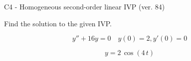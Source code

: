\begin{exercise}
  \begin{exerciseTitle}C4 - Homogeneous second-order linear IVP (ver. 84)\end{exerciseTitle}
  \begin{exerciseStatement}
    
Find the solution to the given IVP.

    
\[y''+16y = 0 \hspace{1em} y(0) = 2 , y'(0) = 0\]

  \end{exerciseStatement}
  \begin{exerciseAnswer}
    
\[y= 2 \, \cos\left(4 \, t\right)\]

  \end{exerciseAnswer}
\end{exercise}